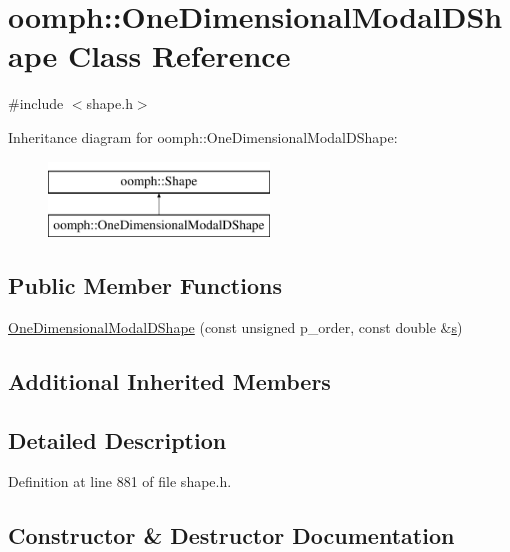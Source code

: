 \hypertarget{classoomph_1_1OneDimensionalModalDShape}{}\section{oomph\+:\+:One\+Dimensional\+Modal\+D\+Shape Class Reference}
\label{classoomph_1_1OneDimensionalModalDShape}


{\ttfamily \#include $<$shape.\+h$>$}

Inheritance diagram for oomph\+:\+:One\+Dimensional\+Modal\+D\+Shape\+:\begin{figure}[H]
\begin{center}
\leavevmode
\includegraphics[height=2.000000cm]{classoomph_1_1OneDimensionalModalDShape}
\end{center}
\end{figure}
\subsection*{Public Member Functions}
\begin{DoxyCompactItemize}
\item 
\hyperlink{classoomph_1_1OneDimensionalModalDShape_aad87f824d8724fb807c5231c35f739ec}{One\+Dimensional\+Modal\+D\+Shape} (const unsigned p\+\_\+order, const double \&\hyperlink{cfortran_8h_ab7123126e4885ef647dd9c6e3807a21c}{s})
\end{DoxyCompactItemize}
\subsection*{Additional Inherited Members}


\subsection{Detailed Description}


Definition at line 881 of file shape.\+h.



\subsection{Constructor \& Destructor Documentation}
\mbox{\label{classoomph_1_1OneDimensionalModalDShape_aad87f824d8724fb807c5231c35f739ec}} 

